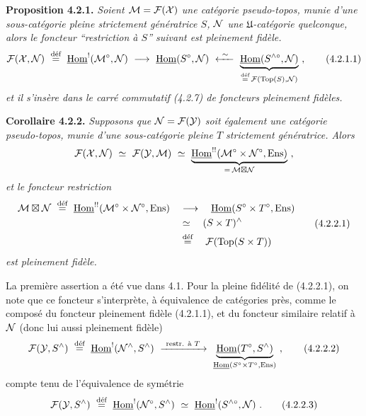 \textbf{Proposition 4.2.1.} \textit{Soient $\mathcal{M}=\mathcal{F}(\mathcal{X})$ une catégorie pseudo-topos, munie d'une sous-catégorie pleine strictement génératrice $S$, $\mathcal{N}$ une $\mathfrak{U}$-catégorie quelconque, alors le foncteur “restriction à $S$” suivant est pleinement fidèle.}
\[
\cF(\cX,\cN) \ \defeq\ \uHom^{!}(\cM^{\circ},\cN) \ \longrightarrow\ \uHom(S^{\circ},\cN) \ \xleftarrow{\ \sim\ }\ \underbrace{\uHom(S^{\wedge\circ},\cN)}_{\defeq\, \cF(\Top(S),\cN)} \ ,
\tag*{(4.2.1.1)}
\]
\textit{et il s'insère dans le carré commutatif (4.2.7) de foncteurs pleinement fidèles.}

\textbf{Corollaire 4.2.2.} \textit{Supposons que $\mathcal{N}=\mathcal{F}(\mathcal{Y})$ soit également une catégorie pseudo-topos, munie d'une sous-catégorie pleine $T$ strictement génératrice. Alors}
\[
\mathcal{F}(\mathcal{X},\mathcal{N}) \ \simeq\ \mathcal{F}(\mathcal{Y},\mathcal{M}) \ \simeq\ \underbrace{\underline{\mathrm{Hom}}^{!!}(\mathcal{M}^{\circ}\times\mathcal{N}^{\circ},\mathrm{Ens})}_{=\,\mathcal{M}\boxtimes\mathcal{N}} \ ,
\]
\textit{et le foncteur restriction}
\[
\begin{aligned}
\cM\bt\cN \ \defeq\ \uHom^{!!}(\cM^{\circ}\times\cN^{\circ},\Ens) \quad &\longrightarrow \quad \uHom(S^{\circ}\times T^{\circ},\Ens)\\
&\simeq \quad (S\times T)^{\wedge}\\
&\defeq \quad \cF(\Top(S\times T))
\end{aligned}
\tag*{(4.2.2.1)}
\]
\textit{est pleinement fidèle.}

La première assertion a été vue dans 4.1. Pour la pleine fidélité de (4.2.2.1), on note que ce foncteur s'interprète, à équivalence de catégories près, comme le composé du foncteur pleinement fidèle (4.2.1.1), et du foncteur
similaire relatif à $\mathcal{N}$ (donc lui aussi pleinement fidèle)
\[
\cF(\cY,S^{\wedge}) \ \defeq\ \uHom^{!}(\cN^{\wedge},S^{\wedge}) \ \xrightarrow{\ \text{restr. à } T\ }\ \underbrace{\uHom(T^{\circ},S^{\wedge})}_{\uHom(S^{\circ}\times T^{\circ},\Ens)} \ ,
\tag*{(4.2.2.2)} %
\]
compte tenu de l'équivalence de symétrie
\[
\cF(\cY,S^{\wedge}) \ \defeq\ \uHom^{!}(\cN^{\circ},S^{\wedge}) \ \simeq\ \uHom^{!}(S^{\wedge\circ},\cN) \ .
\tag*{(4.2.2.3)}
\]

